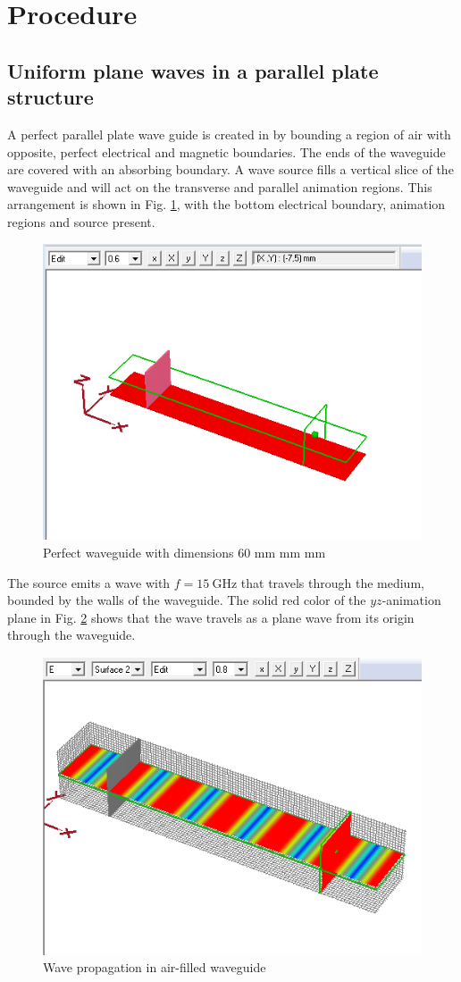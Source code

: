 \section{Procedure}\label{sec:procedure}
\subsection{Uniform plane waves in a parallel plate structure}\label{sec:upw}
A perfect parallel plate wave guide is created in \mefisto{} by bounding a region of air with opposite, perfect electrical and magnetic boundaries.
The ends of the waveguide are covered with an absorbing boundary.
A wave source fills a vertical slice of the waveguide and will act on the transverse and parallel animation regions.
This arrangement is shown in Fig. \ref{fig:waveguide}, with the bottom electrical boundary, animation regions and source present.

\begin{figure}[tbph]
	\centering
	\includegraphics[width=0.7\linewidth]{graphics/waveguide}
	\caption{Perfect waveguide with dimensions 60 mm  mm  mm}
	\label{fig:waveguide}
\end{figure}

The source emits a wave with $f = \SI{15}{\giga\hertz}$ that travels through the medium, bounded by the walls of the waveguide.
The solid red color of the $yz$-animation plane in Fig. \ref{fig:Task1-2dsurface} shows that the wave travels as a plane wave from its origin through the waveguide.

\begin{figure}[tbph]
	\centering
	\includegraphics[width=0.7\linewidth]{graphics/Task1-2dsurface}
	\caption{Wave propagation in air-filled waveguide}
	\label{fig:Task1-2dsurface}
\end{figure}

